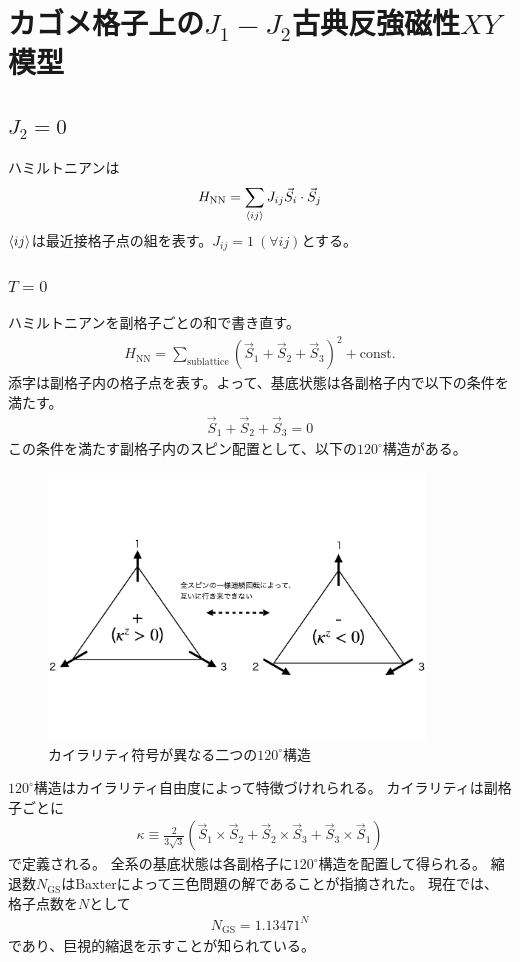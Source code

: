 \documentclass[12pt,titlepage,dvipdfmx]{jarticle}
\begin{document}
\newpage

\section{カゴメ格子上の$J_1-J_2$古典反強磁性$XY$模型}
\subsection{$J_2=0$}
ハミルトニアンは
\begin{align}
   H_{\mathrm{NN}} = \sum_{\ev{ij}}J_{ij}\vec{S}_i\cdot\vec{S}_j
\end{align}
$\ev{ij}$は最近接格子点の組を表す。$J_{ij}=1\ (\forall{ij})$とする。
\subsubsection{$T=0$}
ハミルトニアンを副格子ごとの和で書き直す。
\begin{align}
   H_{\mathrm{NN}} = \sum_{\mathrm{sublattice}} (\vec{S}_1+\vec{S}_2+\vec{S}_3)^2 + \mathrm{const.}
\end{align}
添字は副格子内の格子点を表す。よって、基底状態は各副格子内で以下の条件を満たす。
\begin{align}
   \vec{S}_1+\vec{S}_2+\vec{S}_3 = 0
\end{align}
この条件を満たす副格子内のスピン配置として、以下の$120^\circ$構造がある。
\begin{figure}[tbh]
   \centering
   \includegraphics[width=10cm]{figure/120degs_structures.pdf}
   \caption{カイラリティ符号が異なる二つの$120^\circ$構造}
\end{figure}

$120^\circ$構造はカイラリティ自由度によって特徴づけれられる。
カイラリティは副格子ごとに
\begin{align}
   \kappa \equiv \frac{2}{3\sqrt{3}}(\vec S_1 \times \vec S_2 + \vec S_2 \times \vec S_3 + \vec S_3 \times \vec S_1)
\end{align}
で定義される。
全系の基底状態は各副格子に$120^\circ$構造を配置して得られる。
縮退数$N_{\mathrm{GS}}$はBaxterによって三色問題の解であることが指摘された。
現在では、格子点数を$N$として
\begin{align}
   N_{\mathrm{GS}} = 1.13471^{N}
\end{align}
であり、巨視的縮退を示すことが知られている。
\end{document}
